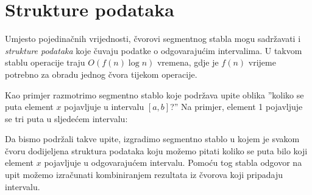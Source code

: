 \section{Strukture podataka}

Umjesto pojedinačnih vrijednosti, čvorovi segmentnog stabla
mogu sadržavati i \emph{strukture podataka} koje čuvaju podatke
o odgovarajućim intervalima.
U takvom stablu operacije traju
$O(f(n) \log n)$ vremena, gdje je $f(n)$
vrijeme potrebno za obradu jednog čvora tijekom operacije.

Kao primjer razmotrimo segmentno stablo koje
podržava upite oblika
''koliko se puta element $x$ pojavljuje
u intervalu $[a,b]$?''
Na primjer, element 1 pojavljuje se tri puta
u sljedećem intervalu:

\begin{center}
\end{center}

Da bismo podržali takve upite, izgradimo segmentno stablo
u kojem je svakom čvoru dodijeljena struktura podataka
koju možemo pitati koliko se puta bilo koji element $x$
pojavljuje u odgovarajućem intervalu.
Pomoću tog stabla
odgovor na upit možemo izračunati
kombiniranjem rezultata iz čvorova
koji pripadaju intervalu.

